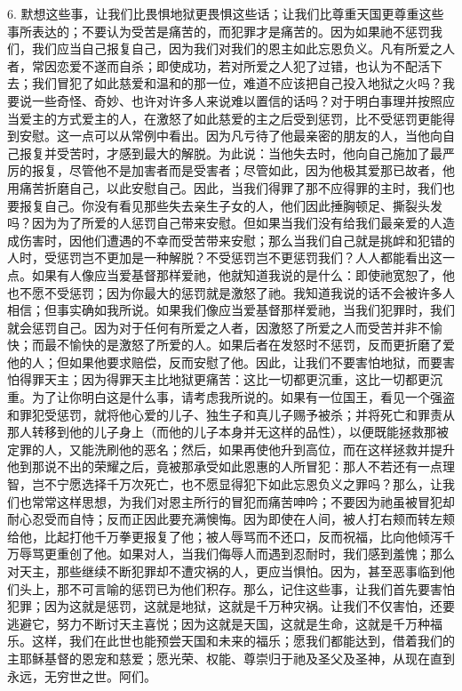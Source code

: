 6. 默想这些事，让我们比畏惧地狱更畏惧这些话；让我们比尊重天国更尊重这些事所表达的；不要认为受苦是痛苦的，而犯罪才是痛苦的。因为如果祂不惩罚我们，我们应当自己报复自己，因为我们对我们的恩主如此忘恩负义。凡有所爱之人者，常因恋爱不遂而自杀；即使成功，若对所爱之人犯了过错，也认为不配活下去；我们冒犯了如此慈爱和温和的那一位，难道不应该把自己投入地狱之火吗？我要说一些奇怪、奇妙、也许对许多人来说难以置信的话吗？对于明白事理并按照应当爱主的方式爱主的人，在激怒了如此慈爱的主之后受到惩罚，比不受惩罚更能得到安慰。这一点可以从常例中看出。因为凡亏待了他最亲密的朋友的人，当他向自己报复并受苦时，才感到最大的解脱。为此说：当他失去时，他向自己施加了最严厉的报复，尽管他不是加害者而是受害者；尽管如此，因为他极其爱那已故者，他用痛苦折磨自己，以此安慰自己。因此，当我们得罪了那不应得罪的主时，我们也要报复自己。你没有看见那些失去亲生子女的人，他们因此捶胸顿足、撕裂头发吗？因为为了所爱的人惩罚自己带来安慰。但如果当我们没有给我们最亲爱的人造成伤害时，因他们遭遇的不幸而受苦带来安慰；那么当我们自己就是挑衅和犯错的人时，受惩罚岂不更加是一种解脱？不受惩罚岂不更惩罚我们？人人都能看出这一点。如果有人像应当爱基督那样爱祂，他就知道我说的是什么：即使祂宽恕了，他也不愿不受惩罚；因为你最大的惩罚就是激怒了祂。我知道我说的话不会被许多人相信；但事实确如我所说。如果我们像应当爱基督那样爱祂，当我们犯罪时，我们就会惩罚自己。因为对于任何有所爱之人者，因激怒了所爱之人而受苦并非不愉快；而最不愉快的是激怒了所爱的人。如果后者在发怒时不惩罚，反而更折磨了爱他的人；但如果他要求赔偿，反而安慰了他。因此，让我们不要害怕地狱，而要害怕得罪天主；因为得罪天主比地狱更痛苦：这比一切都更沉重，这比一切都更沉重。为了让你明白这是什么事，请考虑我所说的。如果有一位国王，看见一个强盗和罪犯受惩罚，就将他心爱的儿子、独生子和真儿子赐予被杀；并将死亡和罪责从那人转移到他的儿子身上（而他的儿子本身并无这样的品性），以便既能拯救那被定罪的人，又能洗刷他的恶名；然后，如果再使他升到高位，而在这样拯救并提升他到那说不出的荣耀之后，竟被那承受如此恩惠的人所冒犯：那人不若还有一点理智，岂不宁愿选择千万次死亡，也不愿显得犯下如此忘恩负义之罪吗？那么，让我们也常常这样思想，为我们对恩主所行的冒犯而痛苦呻吟；不要因为祂虽被冒犯却耐心忍受而自恃；反而正因此要充满懊悔。因为即使在人间，被人打右颊而转左颊给他，比起打他千万拳更报复了他；被人辱骂而不还口，反而祝福，比向他倾泻千万辱骂更重创了他。如果对人，当我们侮辱人而遇到忍耐时，我们感到羞愧；那么对天主，那些继续不断犯罪却不遭灾祸的人，更应当惧怕。因为，甚至恶事临到他们头上，那不可言喻的惩罚已为他们积存。那么，记住这些事，让我们首先要害怕犯罪；因为这就是惩罚，这就是地狱，这就是千万种灾祸。让我们不仅害怕，还要逃避它，努力不断讨天主喜悦；因为这就是天国，这就是生命，这就是千万种福乐。这样，我们在此世也能预尝天国和未来的福乐；愿我们都能达到，借着我们的主耶稣基督的恩宠和慈爱；愿光荣、权能、尊崇归于祂及圣父及圣神，从现在直到永远，无穷世之世。阿们。\par

